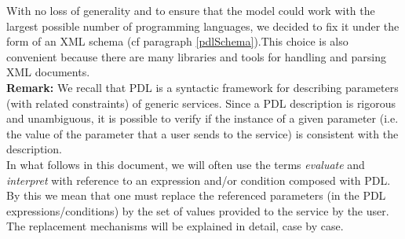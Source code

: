 \documentclass[a4paper,11pt] {ivoa}
\begin{document}
With no loss of generality and to ensure that the model could work with the largest possible number
of programming languages, we decided to fix it under the form of an XML schema (cf paragraph \ref{pdlSchema}).This choice is also
convenient because there are many libraries and tools for handling and parsing XML documents.\\

{\bf Remark:} We recall that PDL is a syntactic framework for describing parameters (with related
constraints) of generic services. Since a PDL description is rigorous and unambiguous, 
it is possible to verify if the instance of a given parameter (i.e. the value of the parameter
that a user sends to the service) is consistent with the description.\\
In what follows in this document, we will often use the terms {\it evaluate} and {\it interpret}
with reference to an expression and/or condition composed with PDL. By this we mean that one must
replace the referenced parameters (in the PDL expressions/conditions) by the set of values provided to the
service by the user. The replacement mechanisms will be explained in detail, case by case.
\end{document}
